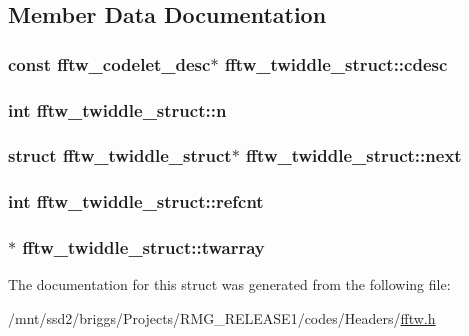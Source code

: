 \subsection{Member Data Documentation}
\hypertarget{structfftw__twiddle__struct_a54bdb5f494d6265576fbcedc9b8bc513}{
\subsubsection[{cdesc}]{\setlength{\rightskip}{0pt plus 5cm}const {\bf fftw\-\_\-codelet\-\_\-desc}$\ast$ fftw\-\_\-twiddle\-\_\-struct\-::cdesc}}\label{structfftw__twiddle__struct_a54bdb5f494d6265576fbcedc9b8bc513}
\hypertarget{structfftw__twiddle__struct_a1ef8adb93bb61bac933d4b59c8031087}{
\subsubsection[{n}]{\setlength{\rightskip}{0pt plus 5cm}int fftw\-\_\-twiddle\-\_\-struct\-::n}}\label{structfftw__twiddle__struct_a1ef8adb93bb61bac933d4b59c8031087}
\hypertarget{structfftw__twiddle__struct_a6bb8fd55d4b24190d2899f753ef94eaf}{
\subsubsection[{next}]{\setlength{\rightskip}{0pt plus 5cm}struct {\bf fftw\-\_\-twiddle\-\_\-struct}$\ast$ fftw\-\_\-twiddle\-\_\-struct\-::next}}\label{structfftw__twiddle__struct_a6bb8fd55d4b24190d2899f753ef94eaf}
\hypertarget{structfftw__twiddle__struct_ab6c2135b5ccb5c2941b0e48eeb10cd08}{
\subsubsection[{refcnt}]{\setlength{\rightskip}{0pt plus 5cm}int fftw\-\_\-twiddle\-\_\-struct\-::refcnt}}\label{structfftw__twiddle__struct_ab6c2135b5ccb5c2941b0e48eeb10cd08}
\hypertarget{structfftw__twiddle__struct_ac9d49fa830d0e0e59de456bb4a614fe4}{
\subsubsection[{twarray}]{$\ast$ fftw\-\_\-twiddle\-\_\-struct\-::twarray}}\label{structfftw__twiddle__struct_ac9d49fa830d0e0e59de456bb4a614fe4}


The documentation for this struct was generated from the following file\-:\begin{DoxyCompactItemize}
\item 
/mnt/ssd2/briggs/\-Projects/\-R\-M\-G\-\_\-\-R\-E\-L\-E\-A\-S\-E1/codes/\-Headers/\hyperlink{fftw_8h}{fftw.\-h}\end{DoxyCompactItemize}
